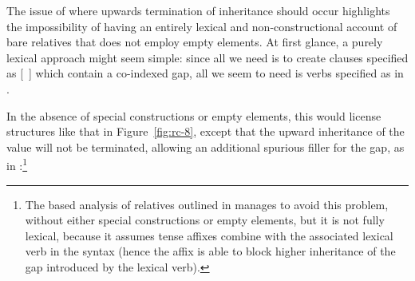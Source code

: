 \documentclass[output=paper
 	        ,biblatex
                ,babelshorthands
                ,newtxmath
                ,draftmode
                ,colorlinks, citecolor=brown
]{langscibook}
\begin{document}
The issue of where upwards termination of  inheritance should occur
highlights the impossibility of having an entirely lexical and non-constructional account
of bare relatives that does not employ empty elements. At first glance, a purely lexical
approach might seem
simple: since all we need is to create clauses specified as [~] which contain a
co-indexed gap, all we seem to need is verbs specified as in .
\begin{exe}\ex\label{x:rc-97}
\end{exe}
In the absence of special constructions or empty elements, this would license structures
like that in Figure~\ref{fig:rc-8}, except that the upward inheritance of the  value will not be
terminated, allowing an additional spurious filler for the gap, as in
:\footnote{The  based analysis of  relatives outlined in
  \citet{SiraiGunjiRelative} manages to avoid this problem, without either special
  constructions or empty elements, but it is not fully lexical, because it assumes 
  tense affixes combine with the associated lexical verb in the syntax (hence the affix is
  able to block higher inheritance of the gap introduced by the lexical verb).}
\begin{exe}
\end{exe} 
\end{document}
